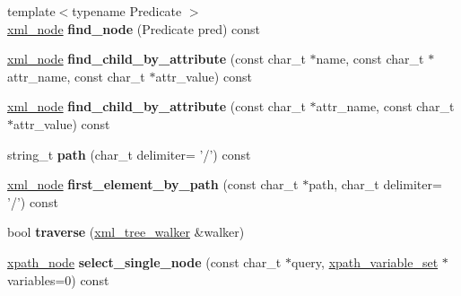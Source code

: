 \begin{DoxyCompactItemize}
\item 
\hypertarget{classpugi_1_1xml__node_a28ccb61937080e9cefe991a0c6837be6}{{\footnotesize template$<$typename Predicate $>$ }\\\hyperlink{classpugi_1_1xml__node}{xml\-\_\-node} {\bfseries find\-\_\-node} (Predicate pred) const }\label{classpugi_1_1xml__node_a28ccb61937080e9cefe991a0c6837be6}

\item 
\hypertarget{classpugi_1_1xml__node_adcbe6392a84e4d156cca69c8ec3224da}{\hyperlink{classpugi_1_1xml__node}{xml\-\_\-node} {\bfseries find\-\_\-child\-\_\-by\-\_\-attribute} (const char\-\_\-t $\ast$name, const char\-\_\-t $\ast$attr\-\_\-name, const char\-\_\-t $\ast$attr\-\_\-value) const }\label{classpugi_1_1xml__node_adcbe6392a84e4d156cca69c8ec3224da}

\item 
\hypertarget{classpugi_1_1xml__node_a96377b213e80a99cc21db911610b88e0}{\hyperlink{classpugi_1_1xml__node}{xml\-\_\-node} {\bfseries find\-\_\-child\-\_\-by\-\_\-attribute} (const char\-\_\-t $\ast$attr\-\_\-name, const char\-\_\-t $\ast$attr\-\_\-value) const }\label{classpugi_1_1xml__node_a96377b213e80a99cc21db911610b88e0}

\item 
\hypertarget{classpugi_1_1xml__node_ae5694be88058346ad8e6e418410d4979}{string\-\_\-t {\bfseries path} (char\-\_\-t delimiter= '/') const }\label{classpugi_1_1xml__node_ae5694be88058346ad8e6e418410d4979}

\item 
\hypertarget{classpugi_1_1xml__node_ae701cc3920f4a779610f94219bb41fe1}{\hyperlink{classpugi_1_1xml__node}{xml\-\_\-node} {\bfseries first\-\_\-element\-\_\-by\-\_\-path} (const char\-\_\-t $\ast$path, char\-\_\-t delimiter= '/') const }\label{classpugi_1_1xml__node_ae701cc3920f4a779610f94219bb41fe1}

\item 
\hypertarget{classpugi_1_1xml__node_a951d5d02987f75fabc4d575cfdeec8b4}{bool {\bfseries traverse} (\hyperlink{classpugi_1_1xml__tree__walker}{xml\-\_\-tree\-\_\-walker} \&walker)}\label{classpugi_1_1xml__node_a951d5d02987f75fabc4d575cfdeec8b4}

\item 
\hypertarget{classpugi_1_1xml__node_a51ae1ebf6d78f80f9e91f5d64c143d78}{\hyperlink{classpugi_1_1xpath__node}{xpath\-\_\-node} {\bfseries select\-\_\-single\-\_\-node} (const char\-\_\-t $\ast$query, \hyperlink{classpugi_1_1xpath__variable__set}{xpath\-\_\-variable\-\_\-set} $\ast$variables=0) const }\label{classpugi_1_1xml__node_a51ae1ebf6d78f80f9e91f5d64c143d78}


\end{DoxyCompactItemize}
